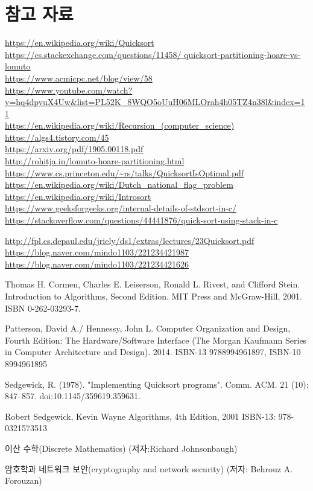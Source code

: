 
\section*{참고 자료}
\url{https://en.wikipedia.org/wiki/Quicksort} \\
\url{https://cs.stackexchange.com/questions/11458/ quicksort-partitioning-hoare-vs-lomuto} \\
\url{https://www.acmicpc.net/blog/view/58} \\
\url{https://www.youtube.com/watch?v=hq4dpyuX4Uw&list=PL52K_8WQO5oUuH06MLOrah4h05TZ4n38l&index=11} \\
\url{https://en.wikipedia.org/wiki/Recursion_(computer_science)} \\
\url{https://algs4.tistory.com/45} \\
\url{https://arxiv.org/pdf/1905.00118.pdf} \\
\url{http://rohitja.in/lomuto-hoare-partitioning.html} \\


\url{https://www.cs.princeton.edu/~rs/talks/QuicksortIsOptimal.pdf}
\url{https://en.wikipedia.org/wiki/Dutch_national_flag_problem}\\
\url{https://en.wikipedia.org/wiki/Introsort}\\
\url{https://www.geeksforgeeks.org/internal-details-of-stdsort-in-c/}
\url{https://stackoverflow.com/questions/44441876/quick-sort-using-stack-in-c}

\url{http://fpl.cs.depaul.edu/jriely/ds1/extras/lectures/23Quicksort.pdf}
\url{ https://blog.naver.com/mindo1103/221234421987}\\
\url{https://blog.naver.com/mindo1103/221234421626}

\begin{thebibliography}{}
    Thomas H. Cormen, Charles E. Leiserson, Ronald L. Rivest, and Clifford Stein. Introduction to Algorithms, Second Edition. MIT Press and McGraw-Hill, 2001. ISBN 0-262-03293-7.
    
    Patterson, David A./ Hennessy, John L. Computer Organization and Design, Fourth Edition: The Hardware/Software Interface (The Morgan Kaufmann Series in Computer Architecture and Design). 2014. ISBN-13 9788994961897, ISBN-10 8994961895

    Sedgewick, R. (1978). "Implementing Quicksort programs". Comm. ACM. 21 (10): 847–857. doi:10.1145/359619.359631.

    Robert Sedgewick, Kevin Wayne Algorithms, 4th Edition, 2001 ISBN-13: 978-0321573513

     이산 수학(Discrete Mathematics) (저자:Richard Johnsonbaugh)

     암호학과 네트워크 보안(cryptography and network security) (저자: Behrouz A. Forouzan)

\end{thebibliography}

